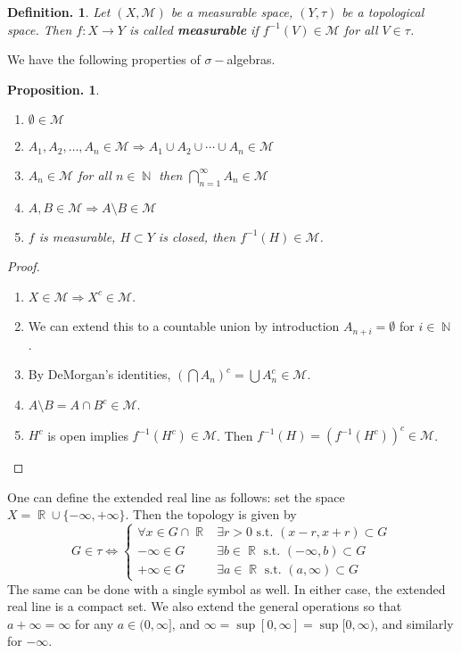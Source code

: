 \documentclass[11pt, a4paper]{memoir}
\DeclareMathOperator{\N}{{\mathbb{N}}}
\DeclareMathOperator{\R}{{\mathbb{R}}}
\theoremstyle{change}
\newtheorem{proposition}[theorem]{Proposition.}
\theoremstyle{plain}
\theoremstyle{nonumberplain}
\newtheorem{definition}{Definition.}
\newtheorem{proof}{Proof}
\begin{document}
\begin{definition}
    Let $(X,\mathcal{M})$ be a measurable space, $(Y,\tau)$ be a topological space.
    Then $f:X\to Y$ is called \textbf{measurable} if $f^{-1}(V)\in\mathcal{M}$ for all $V\in\tau$.
\end{definition}
We have the following properties of $\sigma-$algebras.
\begin{proposition}
    \begin{enumerate}[nolistsep]
        \item $\emptyset\in\mathcal{M}$
        \item $A_1,A_2,\ldots,A_n\in\mathcal{M}\Rightarrow A_1\cup A_2\cup\cdots \cup A_n\in\mathcal{M}$
        \item $A_n\in\mathcal{M}$ for all $n\in\N$ then $\bigcap_{n=1}^\infty A_n\in\mathcal{M}$
        \item $A,B\in\mathcal{M}\Rightarrow A\setminus B\in\mathcal{M}$
        \item $f$ is measurable, $H\subset Y$ is closed, then $f^{-1}(H)\in\mathcal{M}$.
    \end{enumerate}
\end{proposition}
\begin{proof}
    \begin{enumerate}[nolistsep]
        \item $X\in\mathcal{M}\Rightarrow X^c\in\mathcal{M}$.
        \item We can extend this to a countable union by introduction $A_{n+i}=\emptyset$ for $i\in\N$.
        \item By DeMorgan's identities, $(\bigcap A_n)^c=\bigcup A_n^c\in\mathcal{M}$.
        \item $A\setminus B=A\cap B^c\in\mathcal{M}$.
        \item $H^c$ is open implies $f^{-1}(H^c)\in\mathcal{M}$.
            Then $f^{-1}(H)=(f^{-1}(H^c))^c\in\mathcal{M}$.
    \end{enumerate}
\end{proof}
One can define the extended real line as follows: set the space $X=\R\cup\{-\infty,+\infty\}$.
Then the topology is given by
\[G\in\tau\Leftrightarrow
    \begin{cases}
        \forall x\in G\cap\R & \exists r>0 \text{ s.t. } (x-r,x+r)\subset G\\
        -\infty\in G & \exists b\in\R \text{ s.t. }(-\infty,b)\subset G\\
        +\infty\in G & \exists a\in\R \text{ s.t. }(a,\infty)\subset G
    \end{cases}
\]
The same can be done with a single symbol as well.
In either case, the extended real line is a compact set.
We also extend the general operations so that $a+\infty=\infty$ for any $a\in(0,\infty]$, and $\infty=\sup[0,\infty]=\sup[0,\infty)$, and similarly for $-\infty$.
\end{document}
